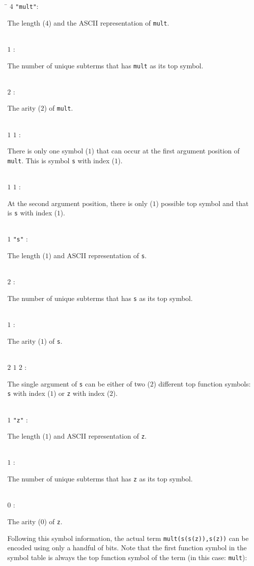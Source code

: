 \documentclass{article}
\newcommand{\tabline}[2]
{#1\>:
\begin{minipage}[t]{\textwidth-1.5cm}
#2
\end{minipage}}
\begin{document}
\begin{tabbing}
\hspace{1.5cm}\=\kill
\tabline{$4$ \texttt{"mult"}}{The length ($4$) and the ASCII representation of \texttt{mult}.}\\
\tabline{$1$                }{The number of unique subterms that has \texttt{mult} as its top symbol.}\\
\tabline{$2$                }{The arity ($2$) of \texttt{mult}.}\\
\tabline{$1$ $1$            }{There is only one symbol ($1$) that can occur at the first argument position of
                              \texttt{mult}. This is symbol \texttt{s} with index ($1$).}\\
\tabline{$1$ $1$            }{At the second argument position, there is only ($1$) possible top symbol and that is
                              \texttt{s} with index ($1$).}\\
\tabline{$1$ \texttt{"s"}   }{The length ($1$) and ASCII representation of \texttt{s}.}\\
\tabline{$2$                }{The number of unique subterms that has \texttt{s} as its top symbol.}\\
\tabline{$1$                }{The arity ($1$) of \texttt{s}.}\\
\tabline{$2$ $1$ $2$        }{The single argument of \texttt{s} can be either of two ($2$) different top function
                              symbols: \texttt{s} with index ($1$) or \texttt{z} with index ($2$).}\\
\tabline{$1$ \texttt{"z"}   }{The length ($1$) and ASCII representation of \texttt{z}.}\\
\tabline{$1$                }{The number of unique subterms that has \texttt{z} as its top symbol.}\\
\tabline{$0$                }{The arity ($0$) of \texttt{z}.}
\end{tabbing}

Following this symbol information, the actual term \texttt{mult(s(s(z)),s(z))} can be encoded using only
a handful of bits. Note that the first function symbol in the symbol table is always the top function symbol
of the term (in this case: \texttt{mult}):
\end{document}
